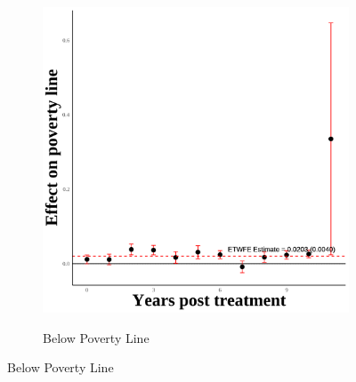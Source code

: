 \documentclass[12pt,english]{article}
\begin{document}
\begin{figure}[H]
\begin{subfigure}[b]{0.3\textwidth}
    \label{fig:snap-first}
  \end{subfigure}
  \hfill
  \begin{subfigure}[b]{0.3\textwidth}
    \centering
    \caption{Below Poverty Line}
    \includegraphics[width=\linewidth]{figures/plot14-poverty_line_event_study-first.png}
    \label{fig:poverty-line-first}
  \end{subfigure}

  \vspace{0.3cm} %


\end{figure}
\end{document}
